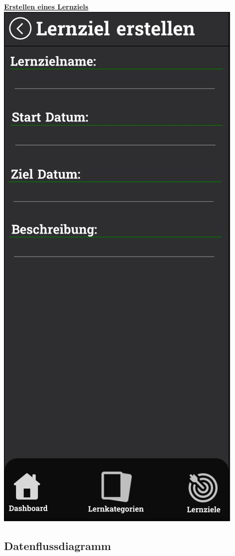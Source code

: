 \newpage
\begin{center}
    \underline{\textbf{Erstellen eines Lernziels}}\\
    \includegraphics[width=.5\textwidth]{images/Mockups/LernzielErstellen.JPG}
\end{center}

\subsection{Datenflussdiagramm}
